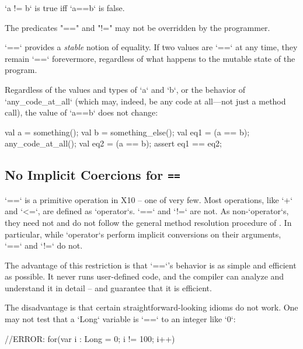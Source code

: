 \xcd`a != b`
is true iff \xcd`a==b` is false.

The predicates \xcd"==" and \xcd"!=" may not be overridden by the programmer.

\xcd`==` provides a {\em stable} notion of equality.  If two values are
\xcd`==` at any time, they remain \xcd`==` forevermore, regardless of what
happens to the mutable state of the program. 

\begin{ex}
Regardless of the values and types of \xcd`a` and \xcd`b`, 
or the behavior of \xcd`any_code_at_all` (which may, indeed, be
any code at all---not just a method call), the value of 
\xcd`a==b` does not change: 
\begin{xten}
val a = something();
val b = something_else();
val eq1 = (a == b);
any_code_at_all();
val eq2 = (a == b);
assert eq1 == eq2;
\end{xten}
\end{ex}



\subsection{No Implicit Coercions for {\tt ==}}
\label{sect:eqeq-no-coerce}

\xcd`==` is a primitive operation in X10 -- one of very few. Most operations,
like \xcd`+` and \xcd`<=`, are defined as \xcd`operator`s. \xcd`==` and
\xcd`!=` are not. As non-\xcd`operator`s, they need not and do not follow the
general method resolution procedure of . In
particular, while \xcd`operator`s perform implicit conversions on their
arguments, \xcd`==` and \xcd`!=` do not.

The advantage of this restriction is that \xcd`==`'s behavior is as simple and
efficient as possible.  It never runs user-defined code, and the compiler can
analyze and understand it in detail -- and guarantee that it is efficient.

The disadvantage is that certain straightforward-looking idioms do not work.
One may not test that a \xcd`Long` variable is \xcd`==` to an integer like
\xcd`0`: 
% 
\begin{xten}
//ERROR: for(var i : Long = 0; i != 100; i++)  {}
\end{xten}





